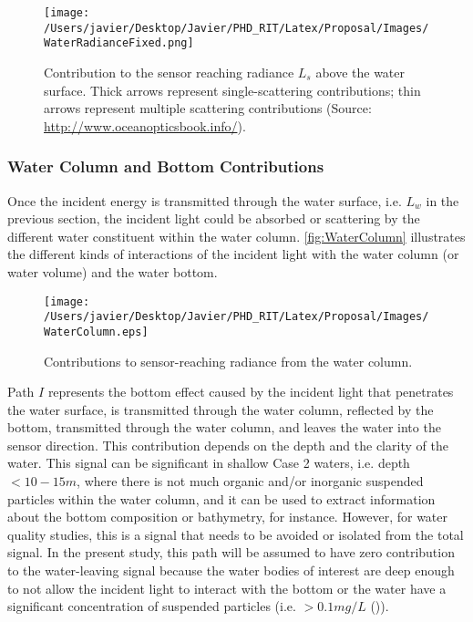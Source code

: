 \begin{figure}[htb]
  \centering
  \texttt{[image: /Users/javier/Desktop/Javier/PHD\_RIT/Latex/Proposal/Images/WaterRadianceFixed.png]}
\caption{Contribution to the sensor reaching radiance $L_s$ above the water surface. Thick arrows represent single-scattering contributions; thin arrows represent multiple scattering contributions (Source: \protect\url{http://www.oceanopticsbook.info/}).}
\label{fig:watercontribution} 
\end{figure}
\subsubsection{Water Column and Bottom Contributions}
Once the incident energy is transmitted through the water surface, i.e. $L_w$ in the previous section, the incident light could be absorbed or scattering by the different water constituent within the water column. \autoref{fig:WaterColumn} illustrates the different kinds of interactions of the incident light with the water column (or water volume) and the water bottom.

\begin{figure}[htb]
  \centering
      \texttt{[image: /Users/javier/Desktop/Javier/PHD\_RIT/Latex/Proposal/Images/WaterColumn.eps]}
  \caption{Contributions to sensor-reaching radiance from the water column.}
  \label{fig:WaterColumn}
\end{figure}

Path $I$ represents the bottom effect caused by the incident light that penetrates the water surface, is transmitted through the water column, reflected by the bottom, transmitted through the water column, and leaves the water into the sensor direction. This contribution depends on the depth and the clarity of the water. This signal can be significant in shallow Case 2 waters, i.e. depth $<10-15m$, where there is not much organic and/or inorganic suspended particles within the water column, and it can be used to extract information about the bottom composition or bathymetry, for instance. However, for water quality studies, this is a signal that needs to be avoided or isolated from the total signal. In the present study, this path will be assumed to have zero contribution to the water-leaving signal because the water bodies of interest are deep enough to not allow the incident light to interact with the bottom or the water have a significant concentration of suspended particles (i.e. $>0.1mg/L$ (\cite{Pahlevan:2012})).


